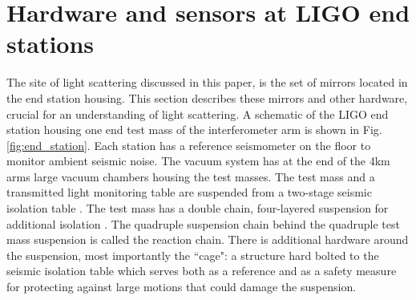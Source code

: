 \documentclass[12pt]{iopart}
\begin{document}
\section{Hardware and sensors at LIGO end stations}\label{hardware} The site of light scattering discussed in this paper, is the set of mirrors located in the end station housing. This section describes these mirrors and other hardware, crucial for an understanding of light scattering.
A schematic of the LIGO end station housing one end test mass \cite{Pinard:17} of the interferometer arm is shown in Fig. \ref{fig:end_station}. Each station has a reference seismometer on the floor to monitor ambient seismic noise. The vacuum system has at the end of the 4km arms large vacuum chambers housing the test masses. The test mass and a transmitted light monitoring table are suspended from a two-stage seismic isolation table \cite{Matichard_2015}. The test mass has a double chain, four-layered suspension for additional isolation \cite{Aston_2012}. The quadruple suspension chain behind the quadruple test mass suspension is called the reaction chain. There is additional hardware around the suspension, most importantly the ``cage": a structure hard bolted to the seismic isolation table which serves both as a reference and as a safety measure for protecting against large motions that could damage the suspension.
\end{document}
